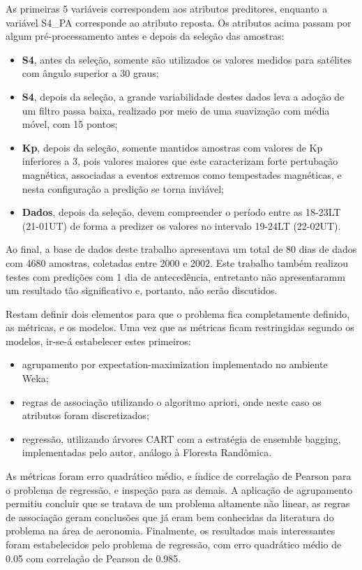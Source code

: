 As primeiras 5 variáveis correspondem aos atributos preditores, enquanto a variável S4\_PA corresponde ao atributo reposta. Os atributos acima passam por algum pré-processamento antes e depois da seleção das amostras:

\begin{itemize}
\item {\bf S4}, antes da seleção, somente são utilizados os valores medidos para satélites com ângulo superior a 30 graus;
\item {\bf S4}, depois da seleção, a grande variabilidade destes dados leva a adoção de um filtro passa baixa, realizado por meio de uma suavização com média móvel, com 15 pontos;
\item {\bf Kp}, depois da seleção, somente mantidos amostras com valores de Kp inferiores a 3, pois valores maiores que este caracterizam forte pertubação magnética, associadas a eventos extremos como tempestades magnéticas, e nesta configuração a predição se torna inviável;
\item {\bf Dados}, depois da seleção, devem compreender o período  entre as 18-23LT (21-01UT) de forma a predizer os valores no intervalo 19-24LT (22-02UT).
\end{itemize}

Ao final, a base de dados deste trabalho apresentava um total de 80 dias de dados com 4680 amostras, coletadas entre 2000 e 2002. Este trabalho também realizou testes com predições com 1 dia de antecedência, entretanto não apresentaramm um resultado tão significativo e, portanto, não serão discutidos.

Restam definir dois elementos para que o problema fica completamente definido, as métricas, e os modelos. Uma vez que as métricas ficam restringidas segundo os modelos, ir-se-á estabelecer estes primeiros:

\begin{itemize}
\item agrupamento por expectation-maximization implementado no ambiente Weka;
\item regras de associação utilizando o algoritmo apriori, onde neste caso os atributos foram discretizados;
\item regressão, utilizando árvores CART com a estratégia de ensemble bagging, implementadas pelo autor, análogo à Floresta Randômica.
\end{itemize}

As métricas foram erro quadrático médio, e índice de correlação de Pearson para o problema de regressão, e inspeção para as demais. A aplicação de agrupamento permitiu concluir que se tratava de um problema altamente não linear, as regras de associação geram conclusões que já eram bem conhecidas da literatura do problema na área de aeronomia. Finalmente, os resultados mais interessantes foram estabelecidos pelo problema de regressão, com erro quadrático médio de 0.05 com correlação de Pearson de 0.985.


